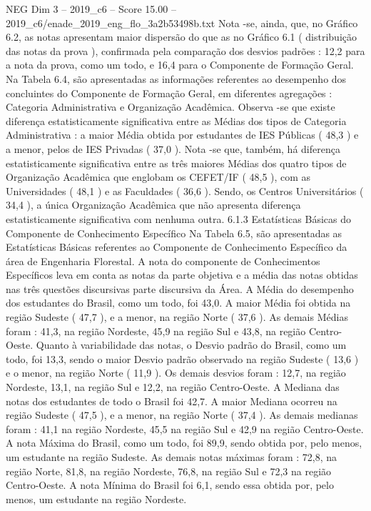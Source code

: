 \begin{textsample}{NEG Dim 3 – 2019\_c6 – Score 15.00 – 2019\_c6/enade\_2019\_eng\_flo\_3a2b53498b.txt}
Nota -se, ainda, que, no Gráfico 6.2, as notas apresentam maior dispersão do que as no Gráfico 6.1 ( distribuição das notas da prova ), confirmada pela comparação dos desvios padrões : 12,2 para a nota da prova, como um todo, e 16,4 para o Componente de Formação Geral.
Na Tabela 6.4, são apresentadas as informações referentes ao desempenho dos concluintes do Componente de Formação Geral, em diferentes agregações : Categoria Administrativa e Organização Acadêmica.
Observa -se que existe diferença estatisticamente significativa entre as Médias dos tipos de Categoria Administrativa : a maior Média obtida por estudantes de IES Públicas ( 48,3 ) e a menor, pelos de IES Privadas ( 37,0 ).
Nota -se que, também, há diferença estatisticamente significativa entre as três maiores Médias dos quatro tipos de Organização Acadêmica que englobam os CEFET/IF ( 48,5 ), com as Universidades ( 48,1 ) e as Faculdades ( 36,6 ).
Sendo, os Centros Universitários ( 34,4 ), a única Organização Acadêmica que não apresenta diferença estatisticamente significativa com nenhuma outra. 6.1.3 Estatísticas Básicas do Componente de Conhecimento Específico Na Tabela 6.5, são apresentadas as Estatísticas Básicas referentes ao Componente de Conhecimento Específico da área de Engenharia Florestal.
A nota do componente de Conhecimentos Específicos leva em conta as notas da parte objetiva e a média das notas obtidas nas três questões discursivas parte discursiva da Área.
A Média do desempenho dos estudantes do Brasil, como um todo, foi 43,0.
A maior Média foi obtida na região Sudeste ( 47,7 ), e a menor, na região Norte ( 37,6 ).
As demais Médias foram : 41,3, na região Nordeste, 45,9 na região Sul e 43,8, na região Centro-Oeste.
Quanto à variabilidade das notas, o Desvio padrão do Brasil, como um todo, foi 13,3, sendo o maior Desvio padrão observado na região Sudeste ( 13,6 ) e o menor, na região Norte ( 11,9 ).
Os demais desvios foram : 12,7, na região Nordeste, 13,1, na região Sul e 12,2, na região Centro-Oeste.
A Mediana das notas dos estudantes de todo o Brasil foi 42,7.
A maior Mediana ocorreu na região Sudeste ( 47,5 ), e a menor, na região Norte ( 37,4 ).
As demais medianas foram : 41,1 na região Nordeste, 45,5 na região Sul e 42,9 na região Centro-Oeste.
A nota Máxima do Brasil, como um todo, foi 89,9, sendo obtida por, pelo menos, um estudante na região Sudeste.
As demais notas máximas foram : 72,8, na região Norte, 81,8, na região Nordeste, 76,8, na região Sul e 72,3 na região Centro-Oeste.
A nota Mínima do Brasil foi 6,1, sendo essa obtida por, pelo menos, um estudante na região Nordeste.

\end{textsample}
